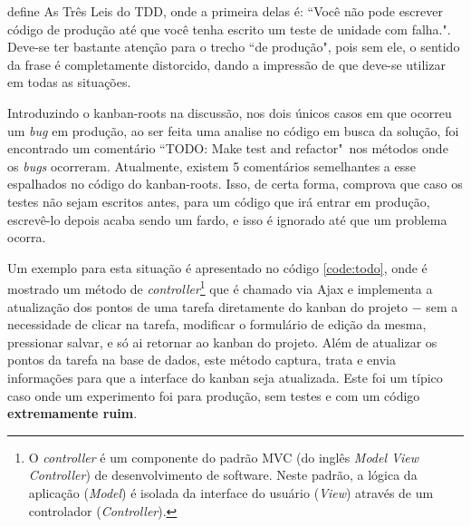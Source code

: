  define As Três Leis do TDD, onde a primeira delas é: ``Você não pode escrever código de produção até que você tenha escrito um teste de unidade com falha.". Deve-se ter bastante atenção para o trecho ``de produção", pois sem ele, o sentido da frase é completamente distorcido, dando a impressão de que deve-se utilizar em todas as situações.

Introduzindo o kanban-roots na discussão, nos dois únicos casos em que ocorreu um \textit{bug} em produção, ao ser feita uma analise no código em busca da solução, foi encontrado um comentário ``TODO: Make test and refactor"\ nos métodos onde os \textit{bugs} ocorreram. Atualmente, existem 5 comentários semelhantes a esse espalhados no código do kanban-roots. Isso, de certa forma, comprova que caso os testes não sejam escritos antes, para um código que irá entrar em produção, escrevê-lo depois acaba sendo um fardo, e isso é ignorado até que um problema ocorra.

Um exemplo para esta situação é apresentado no código \ref{code:todo}, onde é mostrado um método de \textit{controller}\footnote{O \textit{controller} é um componente do padrão MVC (do inglês \textit{Model View Controller}) de desenvolvimento de software. Neste padrão, a lógica da aplicação (\textit{Model}) é isolada da interface do usuário (\textit{View}) através de um controlador (\textit{Controller}).} que é chamado via Ajax e implementa a atualização dos pontos de uma tarefa diretamente do kanban do projeto $-$ sem a necessidade de clicar na tarefa, modificar o formulário de edição da mesma, pressionar salvar, e só ai retornar ao kanban do projeto. Além de atualizar os pontos da tarefa na base de dados, este método captura, trata e envia informações para que a interface do kanban seja atualizada. Este foi um típico caso onde um experimento foi para produção, sem testes e com um código \textbf{extremamente ruim}.

